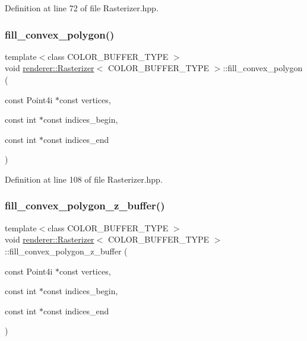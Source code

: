 Definition at line 72 of file Rasterizer.\+hpp.

\mbox{\label{classrenderer_1_1_rasterizer_ad3e74bd49d42824b462beb2060f7815d}} 
\subsubsection{\texorpdfstring{fill\_convex\_polygon()}{fill\_convex\_polygon()}}
{\footnotesize\ttfamily template$<$class C\+O\+L\+O\+R\+\_\+\+B\+U\+F\+F\+E\+R\+\_\+\+T\+Y\+PE $>$ \\
void \mbox{\hyperlink{classrenderer_1_1_rasterizer}{renderer\+::\+Rasterizer}}$<$ C\+O\+L\+O\+R\+\_\+\+B\+U\+F\+F\+E\+R\+\_\+\+T\+Y\+PE $>$\+::fill\+\_\+convex\+\_\+polygon (\begin{DoxyParamCaption}\item[{const Point4i $\ast$const}]{vertices,  }\item[{const int $\ast$const}]{indices\+\_\+begin,  }\item[{const int $\ast$const}]{indices\+\_\+end }\end{DoxyParamCaption})}



Definition at line 108 of file Rasterizer.\+hpp.

\mbox{\label{classrenderer_1_1_rasterizer_a6aab191d54f3062841dc9b85fd98947f}} 
\subsubsection{\texorpdfstring{fill\_convex\_polygon\_z\_buffer()}{fill\_convex\_polygon\_z\_buffer()}}
{\footnotesize\ttfamily template$<$class C\+O\+L\+O\+R\+\_\+\+B\+U\+F\+F\+E\+R\+\_\+\+T\+Y\+PE $>$ \\
void \mbox{\hyperlink{classrenderer_1_1_rasterizer}{renderer\+::\+Rasterizer}}$<$ C\+O\+L\+O\+R\+\_\+\+B\+U\+F\+F\+E\+R\+\_\+\+T\+Y\+PE $>$\+::fill\+\_\+convex\+\_\+polygon\+\_\+z\+\_\+buffer (\begin{DoxyParamCaption}\item[{const Point4i $\ast$const}]{vertices,  }\item[{const int $\ast$const}]{indices\+\_\+begin,  }\item[{const int $\ast$const}]{indices\+\_\+end }\end{DoxyParamCaption})}



